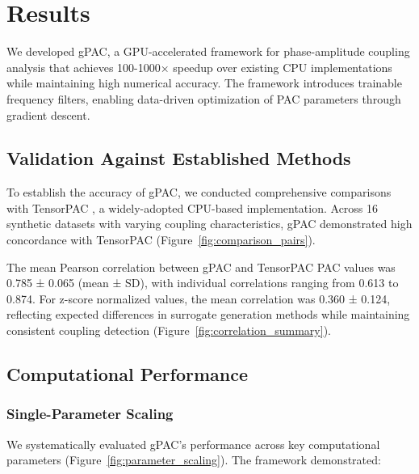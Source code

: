 
\section{Results}

We developed gPAC, a GPU-accelerated framework for phase-amplitude coupling analysis that achieves 100-1000× speedup over existing CPU implementations while maintaining high numerical accuracy. The framework introduces trainable frequency filters, enabling data-driven optimization of PAC parameters through gradient descent.

\subsection{Validation Against Established Methods}

To establish the accuracy of gPAC, we conducted comprehensive comparisons with TensorPAC \citep{Combrisson2020}, a widely-adopted CPU-based implementation. Across 16 synthetic datasets with varying coupling characteristics, gPAC demonstrated high concordance with TensorPAC (Figure~\ref{fig:comparison_pairs}).

The mean Pearson correlation between gPAC and TensorPAC PAC values was 0.785 ± 0.065 (mean ± SD), with individual correlations ranging from 0.613 to 0.874. For z-score normalized values, the mean correlation was 0.360 ± 0.124, reflecting expected differences in surrogate generation methods while maintaining consistent coupling detection (Figure~\ref{fig:correlation_summary}).

\subsection{Computational Performance}

\subsubsection{Single-Parameter Scaling}
We systematically evaluated gPAC's performance across key computational parameters (Figure~\ref{fig:parameter_scaling}). The framework demonstrated:

